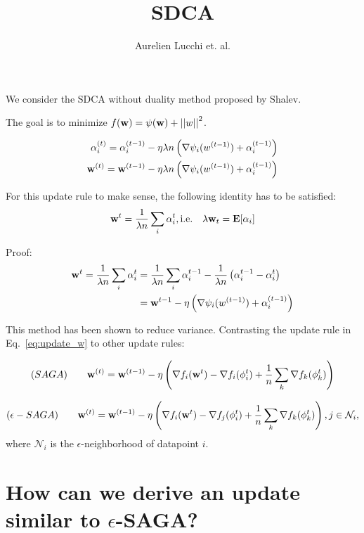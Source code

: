\documentclass{article}
\begin{document}
\title{SDCA}
\author{Aurelien Lucchi et. al.}

\maketitle

We consider the SDCA without duality method proposed by Shalev.

The goal is to minimize $f({\bf w}) = \psi({\bf w}) + \left|\left|w\right|\right|^2$.

\begin{align}
\alpha_i^{(t)} = \alpha_i^{(t-1)} - \eta \lambda n \left( \nabla \psi_i(w^{(t-1)}) + \alpha_i^{(t-1)} \right) \nonumber \\
{\bf w}^{(t)} = {\bf w}^{(t-1)} - \eta \lambda n \left( \nabla \psi_i(w^{(t-1)})  + \alpha_i^{(t-1)} \right)
\label{eq:update_w}
\end{align}

For this update rule to make sense, the following identity has to be satisfied:
\begin{equation}
{\bf w}^t = \frac{1}{\lambda n} \sum_i \alpha_i^{t}, \text{i.e.} \quad \lambda {\bf w}_t = {\mathbf E} [\alpha_i]
\label{eq:w_alpha}
\end{equation}

Proof:
\begin{align}
{\bf w}^t = \frac{1}{\lambda n} \sum_i \alpha_i^{t} &= \frac{1}{\lambda n} \sum_i \alpha_i^{t-1} - \frac{1}{\lambda n} \left( \alpha_i^{t-1} - \alpha_i^{t} \right) \nonumber \\
&= {\bf w}^{t-1} - \eta \left( \nabla \psi_i(w^{(t-1)}) + \alpha_i^{(t-1)} \right)
\end{align}


This method has been shown to reduce variance. Contrasting the update
rule in Eq.~\ref{eq:update_w} to other update rules:

$$
(SAGA) \quad \quad {\bf w}^{(t)} = {\bf w}^{(t-1)} - \eta \left( \nabla f_i({\bf w}^t) - \nabla f_i(\phi_i^t) + \frac{1}{n} \sum_k \nabla f_k(\phi_k^t) \right)
$$

$$
(\epsilon-SAGA) \quad \quad {\bf w}^{(t)} = {\bf w}^{(t-1)} - \eta \left( \nabla f_i({\bf w}^t) - \nabla f_j(\phi_i^t) + \frac{1}{n} \sum_k \nabla f_k(\phi_k^t) \right), j \in \mathcal{N}_i,
$$
where $\mathcal{N}_i$ is the $\epsilon$-neighborhood of datapoint $i$.

\section{How can we derive an update similar to $\epsilon$-SAGA?}
\end{document}
